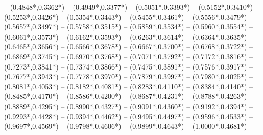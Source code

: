 {	-- ({0.4848*\dx},{0.3362*\dy}) %
	-- ({0.4949*\dx},{0.3377*\dy}) %
	-- ({0.5051*\dx},{0.3393*\dy}) %
	-- ({0.5152*\dx},{0.3410*\dy}) %
	-- ({0.5253*\dx},{0.3426*\dy}) %
	-- ({0.5354*\dx},{0.3443*\dy}) %
	-- ({0.5455*\dx},{0.3461*\dy}) %
	-- ({0.5556*\dx},{0.3479*\dy}) %
	-- ({0.5657*\dx},{0.3497*\dy}) %
	-- ({0.5758*\dx},{0.3515*\dy}) %
	-- ({0.5859*\dx},{0.3534*\dy}) %
	-- ({0.5960*\dx},{0.3554*\dy}) %
	-- ({0.6061*\dx},{0.3573*\dy}) %
	-- ({0.6162*\dx},{0.3593*\dy}) %
	-- ({0.6263*\dx},{0.3614*\dy}) %
	-- ({0.6364*\dx},{0.3635*\dy}) %
	-- ({0.6465*\dx},{0.3656*\dy}) %
	-- ({0.6566*\dx},{0.3678*\dy}) %
	-- ({0.6667*\dx},{0.3700*\dy}) %
	-- ({0.6768*\dx},{0.3722*\dy}) %
	-- ({0.6869*\dx},{0.3745*\dy}) %
	-- ({0.6970*\dx},{0.3768*\dy}) %
	-- ({0.7071*\dx},{0.3792*\dy}) %
	-- ({0.7172*\dx},{0.3816*\dy}) %
	-- ({0.7273*\dx},{0.3841*\dy}) %
	-- ({0.7374*\dx},{0.3866*\dy}) %
	-- ({0.7475*\dx},{0.3891*\dy}) %
	-- ({0.7576*\dx},{0.3917*\dy}) %
	-- ({0.7677*\dx},{0.3943*\dy}) %
	-- ({0.7778*\dx},{0.3970*\dy}) %
	-- ({0.7879*\dx},{0.3997*\dy}) %
	-- ({0.7980*\dx},{0.4025*\dy}) %
	-- ({0.8081*\dx},{0.4053*\dy}) %
	-- ({0.8182*\dx},{0.4081*\dy}) %
	-- ({0.8283*\dx},{0.4110*\dy}) %
	-- ({0.8384*\dx},{0.4140*\dy}) %
	-- ({0.8485*\dx},{0.4170*\dy}) %
	-- ({0.8586*\dx},{0.4200*\dy}) %
	-- ({0.8687*\dx},{0.4231*\dy}) %
	-- ({0.8788*\dx},{0.4263*\dy}) %
	-- ({0.8889*\dx},{0.4295*\dy}) %
	-- ({0.8990*\dx},{0.4327*\dy}) %
	-- ({0.9091*\dx},{0.4360*\dy}) %
	-- ({0.9192*\dx},{0.4394*\dy}) %
	-- ({0.9293*\dx},{0.4428*\dy}) %
	-- ({0.9394*\dx},{0.4462*\dy}) %
	-- ({0.9495*\dx},{0.4497*\dy}) %
	-- ({0.9596*\dx},{0.4533*\dy}) %
	-- ({0.9697*\dx},{0.4569*\dy}) %
	-- ({0.9798*\dx},{0.4606*\dy}) %
	-- ({0.9899*\dx},{0.4643*\dy}) %
	-- ({1.0000*\dx},{0.4681*\dy}) %
}

